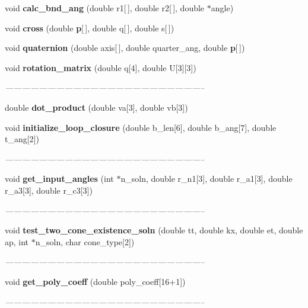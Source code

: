 \begin{CompactItemize}
\item 
void {\bf calc\_\-bnd\_\-ang} (double r1[$\,$], double r2[$\,$], double $\ast$angle)
\item 
void {\bf cross} (double {\bf p}[$\,$], double q[$\,$], double s[$\,$])
\item 
void {\bf quaternion} (double axis[$\,$], double quarter\_\-ang, double {\bf p}[$\,$])
\item 
void {\bf rotation\_\-matrix} (double q[4], double U[3][3])
\begin{CompactList}\small\item\em ----------------------------------------------------------------------- \item\end{CompactList}\item 
double {\bf dot\_\-product} (double va[3], double vb[3])
\item 
void {\bf initialize\_\-loop\_\-closure} (double b\_\-len[6], double b\_\-ang[7], double t\_\-ang[2])
\begin{CompactList}\small\item\em ----------------------------------------------------------------------- \item\end{CompactList}\item 
void {\bf get\_\-input\_\-angles} (int $\ast$n\_\-soln, double r\_\-n1[3], double r\_\-a1[3], double r\_\-a3[3], double r\_\-c3[3])
\begin{CompactList}\small\item\em ----------------------------------------------------------------------- \item\end{CompactList}\item 
void {\bf test\_\-two\_\-cone\_\-existence\_\-soln} (double tt, double kx, double et, double ap, int $\ast$n\_\-soln, char cone\_\-type[2])
\begin{CompactList}\small\item\em ----------------------------------------------------------------------- \item\end{CompactList}\item 
void {\bf get\_\-poly\_\-coeff} (double poly\_\-coeff[16+1])
\begin{CompactList}\small\item\em ----------------------------------------------------------------------- \item\end{CompactList}\item 

\end{CompactItemize}

